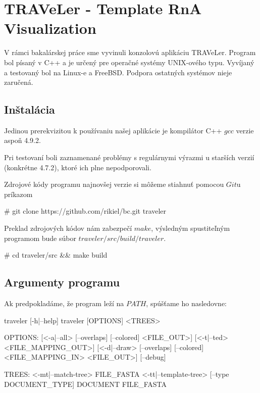
\newcommand{\paramI}[1]{\textit{-#1}}
\newcommand{\param}[1]{\textit{\--\--#1}}

\chapter{TRAVeLer - Template RnA Visualization}

V rámci bakalárskej práce sme vyvinuli konzolovú aplikáciu TRAVeLer.
Program bol písaný v C++ a je určený pre operačné systémy UNIX-ového typu.
Vyvíjaný a testovaný bol na Linux-e a FreeBSD.
Podpora ostatných systémov nieje zaručená.





\section{Inštalácia}

Jedinou prerekvizitou k používaniu našej aplikácie je kompilátor C++
$gcc$ verzie aspoň 4.9.2.

Pri testovaní boli zaznamenané problémy s regulárnymi výrazmi u starších verzií
(konkrétne 4.7.2), ktoré ich plne nepodporovali.

Zdrojové kódy programu najnovšej verzie si môžeme stiahnuť pomocou $Git$u príkazom
\begin{code}[frame=none]
# git clone https://github.com/rikiel/bc.git traveler
\end{code}

Preklad zdrojových kódov nám zabezpečí $make$, výsledným spustiteľným programom
bude súbor $traveler/src/build/traveler$.
\begin{code}[frame=none]
  # cd traveler/src && make build
\end{code}





\section{Argumenty programu}

Ak predpokladáme, že program leží na $PATH$, spúšťame ho nasledovne:

\begin{code}[frame=none]
traveler [-h|--help]
traveler [OPTIONS] <TREES>

OPTIONS:
  [<-a|--all> [--overlaps] [--colored] <FILE_OUT>]
  [<-t|--ted> <FILE_MAPPING_OUT>]
  [<-d|--draw> [--overlaps] [--colored] <FILE_MAPPING_IN> <FILE_OUT>]
  [--debug]

TREES:
  <-mt|--match-tree> FILE_FASTA
  <-tt|--template-tree> [--type DOCUMENT_TYPE] DOCUMENT FILE_FASTA
\end{code}

